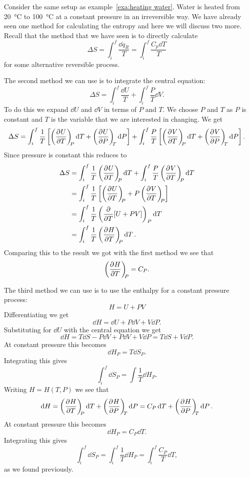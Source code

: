 \documentclass[a4paper]{article}
\begin{document}
    \begin{example}
        Consider the same setup as example~\ref{exa:heating water}.
        Water is heated from \SI{20}{\degreeCelsius} to \SI{100}{\degreeCelsius} at a constant pressure in an irreversible way.
        We have already seen one method for calculating the entropy and here we will discuss two more.
        Recall that the method that we have seen is to directly calculate
        \[\Delta S = \int_i^f \frac{\dd{q_R}}{T} = \int_i^f \frac{C_p\dd{T}}{T}\]
        for some alternative reversible process.
        
        The second method we can use is to integrate the central equation:
        \[\Delta S = \int_i^f \frac{\dd{U}}{T} + \int_i^f \frac{P}{T}\dd{V}.\]
        To do this we expand \(\dd{U}\) and \(\dd{V}\) in terms of \(P\) and \(T\).
        We choose \(P\) and \(T\) as \(P\) is constant and \(T\) is the variable that we are interested in changing.
        We get
        \[\Delta S = \int_i^f \frac{1}{T}\left[\pdvconst{U}{T}{P}\dd{T} + \pdvconst{U}{P}{T}\dd{P}\right] + \int_i^f \frac{P}{T}\left[\pdvconst{V}{T}{P}\dd{T} + \pdvconst{V}{P}{T}\dd{P}\right].\]
        Since pressure is constant this reduces to
        \begin{align*}
            \Delta S &= \int_i^f \frac{1}{T} \pdvconst{U}{T}{P}\dd{T} + \int_i^f \frac{P}{T} \pdvconst{V}{T}{P}\dd{T}\\
                &= \int_i^f \frac{1}{T} \left[\pdvconst{U}{T}{P} + P\pdvconst{V}{T}{P}\right]\\
                &= \int_i^f \frac{1}{T} \left(\pdv{T}[U + PV]\right)_{P}\dd{T}\\
                &= \int_i^f \frac{1}{T} \pdvconst{H}{T}{P}\dd{T}.
        \end{align*}
        Comparing this to the result we got with the first method we see that
        \[\left(\pdv[]{H}{T}\right)_{\!\!{P}} = C_P.\]
        
        The third method we can use is to use the enthalpy for a constant pressure process:
        \[H = U + PV\]
        Differentiating we get
        \[\dd{H} = \dd{U} + P\dd{V} + V\dd{P}.\]
        Substituting for \(\dd{U}\) with the central equation we get
        \[\dd{H} = T\dd{S} - P\dd{V} + P\dd{V} + V\dd{P} = T\dd{S} + V\dd{P}.\]
        At constant pressure this becomes
        \[\dd{H_P} = T\dd{S_P}.\]
        Integrating this gives
        \[\int_i^f\dd{S_P} = \int\frac{1}{T}\dd{H_P}.\]
        Writing \(H = H(T, P)\) we see that
        \[\dd{H} = \left(\pdv[]{H}{T}\right)_{\!\!{P}}\dd{T} + \left(\pdv[]{H}{P}\right)_{\!\!{T}}\dd{P} = C_P\dd{T} + \left(\pdv[]{H}{P}\right)_{\!\!{T}}\dd{P}.\]
        At constant pressure this becomes
        \[\dd{H_P} = C_P\dd{T}.\]
        Integrating this gives
        \[\int_i^f\dd{S_P} = \int_i^f\frac{1}{T}\dd{H_P} = \int_i^f\frac{C_P}{T}\dd{T},\]
        as we found previously.
    \end{example}
\end{document}
